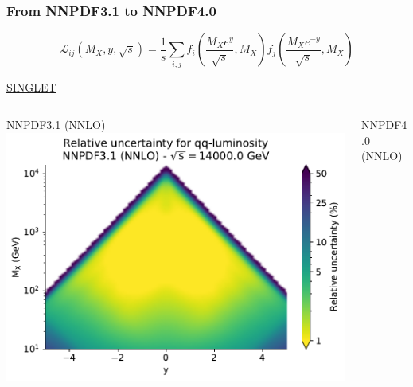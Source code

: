 \documentclass{beamer}
\begin{document}
\begin{frame}
 \frametitle{From NNPDF3.1 to NNPDF4.0}
 \footnotesize
 \centering
 \scriptsize
 \vspace{-0.1cm}
 \begin{equation}
  \mathcal{L}_{ij}(M_X,y,\sqrt{s})=\frac{1}{s}\sum_{i,j}
  f_i\left(\frac{M_Xe^y}{\sqrt{s}},M_X\right) 
  f_j\left(\frac{M_Xe^{-y}}{\sqrt{s}},M_X \right)
  \nonumber
 \end{equation}
 \footnotesize
 \begin{overlayarea}{\textwidth}{5.2cm}
  {
  \centering
  \underline{SINGLET}\\
  \begin{columns}[c]
   \begin{column}{0.5\textwidth}
    \centering
        NNPDF3.1 (NNLO)\\
        \vspace{0.1cm}
        \includegraphics[width=\columnwidth]{plots/plot_lumi2d_uncertainty_NNPDF31_qq}\\
   \end{column}
   \begin{column}{0.5\textwidth}
    \centering
        NNPDF4.0 (NNLO)\\
        \vspace{0.1cm}

\end{column}
\end{columns}}
\end{overlayarea}
\end{frame}
\end{document}

